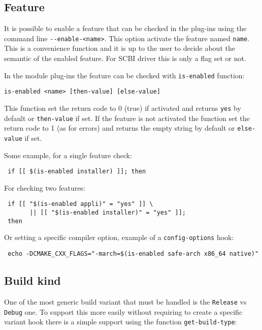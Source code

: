 \documentclass[a4paper,12pt,twoside]{article}
\newcommand{\code}[1]{\texttt{#1}}
\newcommand{\ddash}{-{}-}
\begin{document}
\subsection{Feature}
\label{enable-feature}

It is possible to enable a feature that can be checked in the plug-ins using the command line \code{\ddash{}enable-<name>}. This option activate the feature named \code{name}. This is a convenience function and it is up to the user to decide about the semantic of the enabled feature. For SCBI driver this is only a flag set or not.

In the module plug-ins the feature can be checked with \code{is-enabled} function:

\code{is-enabled <name> [then-value] [else-value]}

This function set the return code to 0 (true) if activated and returns \code{yes} by default or \code{then-value} if set. If the feature is not activated the function set the return code to 1 (as for errors) and returns the empty string by default or \code{else-value} if set.

Some example, for a single feature check:

\begin{lstlisting}
 if [[ $(is-enabled installer) ]]; then
\end{lstlisting}

For checking two features:

\begin{lstlisting}
 if [[ "$(is-enabled appli)" = "yes" ]] \
       || [[ "$(is-enabled installer)" = "yes" ]];
 then
\end{lstlisting}

Or setting a specific compiler option, example of a \code{config-options} hook:

\begin{lstlisting}
 echo -DCMAKE_CXX_FLAGS="-march=$(is-enabled safe-arch x86_64 native)"
\end{lstlisting}

\subsection{Build kind}
 

One of the most generic build variant that must be handled is the \code{Release} vs \code{Debug} one. To support this more easily without requiring to create a specific variant hook there is a simple support using the function \code{get-build-type}:
\end{document}

